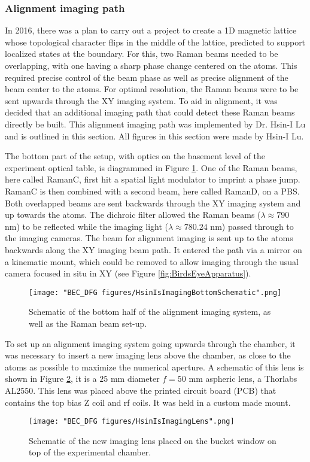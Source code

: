 \subsubsection{Alignment imaging path}
In 2016, there was a plan to carry out a project to create a 1D magnetic lattice whose topological character flips in the middle of the lattice, predicted to support localized states at the boundary. For this, two Raman beams needed to be overlapping, with one having a sharp phase change centered on the atoms. This required precise control of the beam phase as well as precise alignment of the beam center to the atoms. For optimal resolution, the Raman beams were to be sent upwards through the XY imaging system. To aid in alignment, it was decided that an additional imaging path that could detect these Raman beams directly be built. This alignment imaging path was implemented by Dr. Hsin-I Lu and is outlined in this section. All figures in this section were made by Hsin-I Lu. 

The bottom part of the setup, with optics on the basement level of the experiment optical table, is diagrammed in Figure \ref{fig:HsinIsImagingBottomSchematic}. One of the Raman beams, here called RamanC, first hit a spatial light modulator to imprint a phase jump. RamanC is then combined with a second beam, here called RamanD, on a PBS. Both overlapped beams are sent backwards through the XY imaging system and up towards the atoms. The dichroic filter allowed the Raman beams ($\lambda\approx790$ nm) to be reflected while the imaging light ($\lambda\approx780.24$ nm) passed through to the imaging cameras. The beam for alignment imaging is sent up to the atoms backwards along the XY imaging beam path. It entered the path via a mirror on a kinematic mount, which could be removed to allow imaging through the usual camera focused in situ in XY (see Figure \ref{fig:BirdsEyeApparatus}). 
\begin{figure}
	\texttt{[image: "BEC\_DFG figures/HsinIsImagingBottomSchematic".png]}
\caption[Schematic of the bottom half of the alignment imaging system]{Schematic of the bottom half of the alignment imaging system, as well as the Raman beam set-up.}
\label{fig:HsinIsImagingBottomSchematic}
\end{figure}

To set up an alignment imaging system going upwards through the chamber, it was necessary to insert a new imaging lens above the chamber, as close to the atoms as possible to maximize the numerical aperture. A schematic of this lens is shown in Figure \ref{fig:HsinIsImagingLens}, it is a $25$ mm diameter $f=50$ mm aspheric lens, a Thorlabs AL2550. This lens was placed above the printed circuit board (PCB) that contains the top bias Z coil and rf coils. It was held in a custom made mount. 
\begin{figure}
	\texttt{[image: "BEC\_DFG figures/HsinIsImagingLens".png]}
\caption[Schematic of the new imaging lens]{Schematic of the new imaging lens placed on the bucket window on top of the experimental chamber.}
\label{fig:HsinIsImagingLens}
\end{figure}


